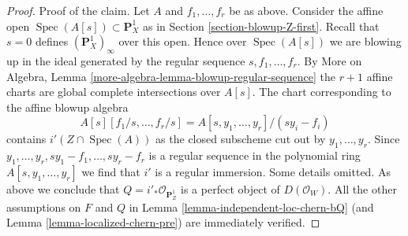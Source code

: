 \documentclass[10pt,a4paper]{amsart}
\theoremstyle{plain}
\theoremstyle{definition}
\theoremstyle{remark}
\numberwithin{equation}{subsection}
\def\Spec{\mathop{\mathrm{Spec}}}
\begin{document}
\begin{proof}
\medskip\noindent
Proof of the claim. Let $A$ and $f_1, \ldots, f_r$ be as above.
Consider the affine open $\Spec(A[s]) \subset \mathbf{P}^1_X$
as in Section \ref{section-blowup-Z-first}. Recall that $s = 0$
defines $(\mathbf{P}^1_X)_\infty$ over this open. Hence over
$\Spec(A[s])$ we are blowing up in the ideal generated by
the regular sequence $s, f_1, \ldots, f_r$. By More on Algebra, Lemma
\ref{more-algebra-lemma-blowup-regular-sequence} the $r + 1$
affine charts are global complete intersections over $A[s]$.
The chart corresponding to the affine blowup algebra
$$
A[s][f_1/s, \ldots, f_r/s] = A[s, y_1, \ldots, y_r]/(sy_i - f_i)
$$
contains $i'(Z \cap \Spec(A))$ as the closed subscheme cut out by
$y_1, \ldots, y_r$. Since $y_1, \ldots, y_r, sy_1 - f_1, \ldots, sy_r - f_r$
is a regular sequence in the polynomial ring $A[s, y_1, \ldots, y_r]$
we find that $i'$ is a regular immersion. Some details omitted.
As above we conclude that $Q = i'_*\mathcal{O}_{\mathbf{P}^1_Z}$
is a perfect object of $D(\mathcal{O}_W)$. All the
other assumptions on $F$ and $Q$ in Lemma \ref{lemma-independent-loc-chern-bQ}
(and Lemma \ref{lemma-localized-chern-pre}) are immediately verified.
\end{proof}
\end{document}
